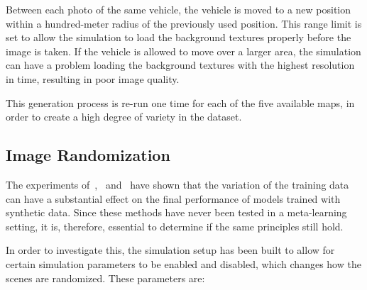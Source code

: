 Between each photo of the same vehicle, the vehicle is moved to a new position within a hundred-meter radius of the previously used position. This range limit is set to allow the simulation to load the background textures properly before the image is taken. If the vehicle is allowed to move over a larger area, the simulation can have a problem loading the background textures with the highest resolution in time, resulting in poor image quality.

This generation process is re-run one time for each of the five available maps, in order to create a high degree of variety in the dataset.

\subsection{Image Randomization}\label{randomization-settings}
The experiments of~\textcite{domainrand},~\textcite{domainrandcars} and~\textcite{structureddomainrandomization} have shown that the variation of the training data can have a substantial effect on the final performance of models trained with synthetic data. Since these methods have never been tested in a meta-learning setting, it is, therefore, essential to determine if the same principles still hold.

In order to investigate this, the simulation setup has been built to allow for certain simulation parameters to be enabled and disabled, which changes how the scenes are randomized. These parameters are: 

